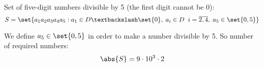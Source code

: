 Set of five-digit numbers divisible by 5 (the first digit cannot be 0):
\[ S = \set{ a_1 a_2 a_3 a_4 a_5 : a_1 \in D \textbackslash \set{0}, \; a_i \in D \;\; i =
\overline{2, 4}, \; a_5 \in \set{0, 5} } \]

We define \( a_5 \in \set{0, 5} \) in order to make a number divisible by 5.
So number of required numbers:
\[ \abs{S} = 9 \cdot 10^{3} \cdot 2 \]


\exercise[1.18]


\exercise[1.19]


\exercise[1.20]


\exercise[1.21]


\exercise[1.22]


\exercise[1.23]


